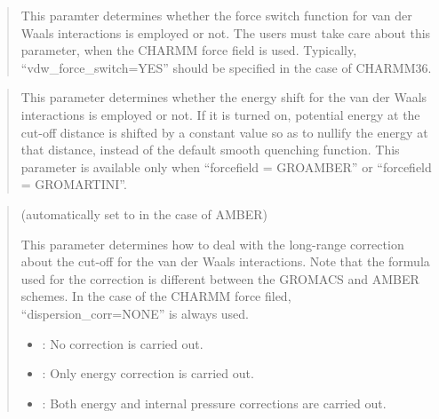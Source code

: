 \documentclass[a4paper,11pt,oneside,english]{sphinxmanual}
\begin{document}
 
\begin{quote}


This paramter determines whether the force switch function for van der Waals
interactions is employed or not. 
The users must take care about this parameter, when the CHARMM force field is used.
Typically, “vdw\_force\_switch=YES” should be specified in the case of CHARMM36.
\end{quote}

 
\begin{quote}


This parameter determines whether the energy shift for the van der Waals interactions
is employed or not. If it is turned on, potential energy at the cut-off distance is
shifted by a constant value so as to nullify the energy at that distance,
instead of the default smooth quenching function.
This parameter is available only when “forcefield = GROAMBER” or “forcefield = GROMARTINI”.
\end{quote}

 
\begin{quote}

 (automatically set to  in the case of AMBER)

This parameter determines how to deal with the long-range correction
about the cut-off for the van der Waals interactions.
Note that the formula used for the correction is different
between the GROMACS and AMBER schemes.
In the case of the CHARMM force filed, “dispersion\_corr=NONE” is always used.
\begin{itemize}
\item {} 
: No correction is carried out.

\item {} 
: Only energy correction is carried out.

\item {} 
: Both energy and internal pressure corrections are carried out.

\end{itemize}
\end{quote}
\end{document}
